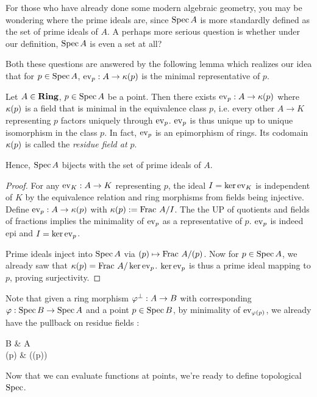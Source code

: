\begin{rmk}[Worries]

  For those who have already done some modern algebraic geometry, 
  you may be wondering where the prime ideals are,
  since $\operatorname{Spec} A$ is more standardly defined as 
  the set of prime ideals of $A$.
  A perhaps more serious question is whether under our definition,
  $\operatorname{Spec} A$ is even a set at all?
  
  Both these questions are answered by the following lemma 
  which realizes our idea that for $p \in \operatorname{Spec} A$,
  $\operatorname{ev}_p : A \to \kappa(p)$ is the minimal representative of $p$.
  
\end{rmk}

\begin{lem}[Evaluation]
  
  Let $A \in \mathbf{Ring}$, $p \in \operatorname{Spec} A$ be a point.
  Then there exists $\operatorname{ev}_p : A \to \kappa(p)$
  where $\kappa(p)$ is a field that is minimal in 
  the equivalence class $p$,
  i.e. every other $A \to K$ representing $p$ 
  factors uniquely through $\operatorname{ev}_p$.
  $\operatorname{ev}_p$ is thus unique up to unique isomorphism in the class $p$.
  In fact, $\operatorname{ev}_p$ is an epimorphism of rings. 
  Its codomain $\kappa(p)$ is called the \emph{residue field at $p$}.

  Hence, 
  $\operatorname{Spec} A$ bijects with the set of prime ideals of $A$.
  
\end{lem}
\begin{proof}
  For any $\operatorname{ev}_K : A \to K$ representing $p$,
  the ideal $I = \ker\operatorname{ev}_K$ is independent of $K$ by 
  the equivalence relation and ring morphisms from fields being injective. 
  Define $\operatorname{ev}_p : A \to \kappa(p)$ with $\kappa(p) := \text{Frac }A/I$.
  The the UP of quotients and fields of fractions 
  implies the minimality of $\operatorname{ev}_p$ as a representative of $p$.
  $\operatorname{ev}_p$ is indeed epi and $I = \ker\operatorname{ev}_p$.

  Prime ideals inject into $\operatorname{Spec} A$ via 
  $\mathfrak{(}p) \mapsto \text{Frac }A/\mathfrak{(}p)$.
  Now for $p \in \operatorname{Spec} A$,
  we already saw that $\kappa(p) = \text{Frac }A/\ker\operatorname{ev}_p$.
  $\ker\operatorname{ev}_p$ is thus a prime ideal mapping to $p$, proving surjectivity. 
\end{proof}

\begin{rmk}
  Note that given a ring morphism $\varphi^\bot : A \to B$
  with corresponding $\varphi : \operatorname{Spec} B \to \operatorname{Spec} A$
  and a point $p \in \operatorname{Spec} B$, 
  by minimality of $\operatorname{ev}_{\varphi(p)}$,
  we already have the pullback on residue fields : 
  \begin{cd}
    B \ar[d,"\ev_p"{swap}] & A  \ar[d,"\ev_{\ph(p)}"]\\
    \ka(p) & \ka(\ph(p)) \ar[l,dashed]
  \end{cd}
  Now that we can evaluate functions at points, 
  we're ready to define topological $\operatorname{Spec}$.
\end{rmk}

